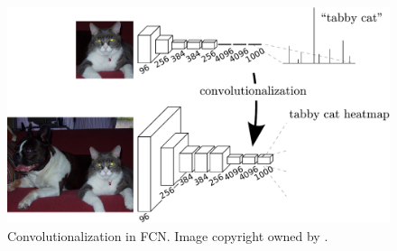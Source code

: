 \begin{figure}[!h]
	\centering
	\includegraphics[width=\figfi\textwidth]{2-05.pdf}
    \caption[Convolutionalization in FCN]{Convolutionalization in FCN. Image copyright owned by \cite{fcn}.}
    \label{fig:convfcn}
\end{figure}